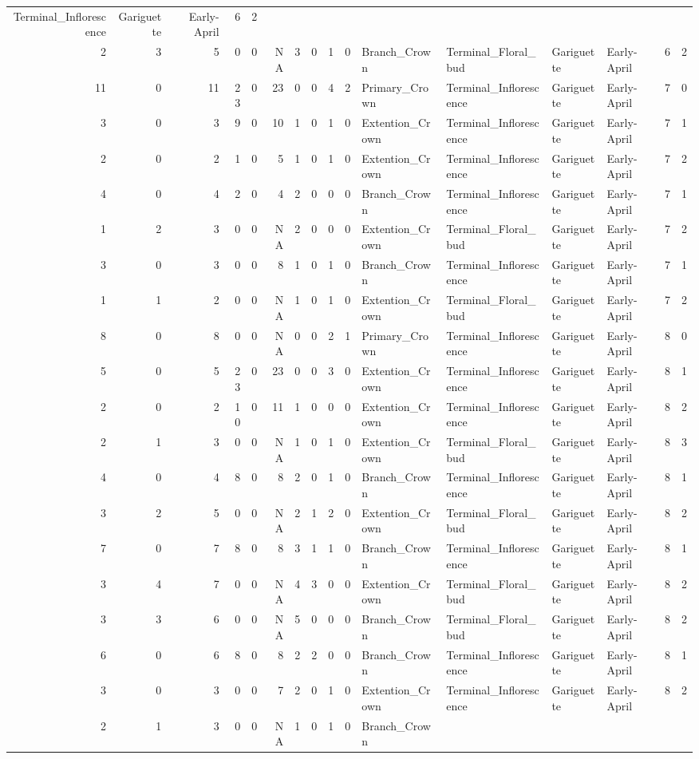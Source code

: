 \documentclass[]{article}
\begin{document}
\begin{longtable}[]{@{}rrrrrrrrrrllllrl@{}}
Terminal\_Inflorescence & Gariguette & Early-April & 6 &
2\tabularnewline
2 & 3 & 5 & 0 & 0 & NA & 3 & 0 & 1 & 0 & Branch\_Crown &
Terminal\_Floral\_bud & Gariguette & Early-April & 6 & 2\tabularnewline
11 & 0 & 11 & 23 & 0 & 23 & 0 & 0 & 4 & 2 & Primary\_Crown &
Terminal\_Inflorescence & Gariguette & Early-April & 7 &
0\tabularnewline
3 & 0 & 3 & 9 & 0 & 10 & 1 & 0 & 1 & 0 & Extention\_Crown &
Terminal\_Inflorescence & Gariguette & Early-April & 7 &
1\tabularnewline
2 & 0 & 2 & 1 & 0 & 5 & 1 & 0 & 1 & 0 & Extention\_Crown &
Terminal\_Inflorescence & Gariguette & Early-April & 7 &
2\tabularnewline
4 & 0 & 4 & 2 & 0 & 4 & 2 & 0 & 0 & 0 & Branch\_Crown &
Terminal\_Inflorescence & Gariguette & Early-April & 7 &
1\tabularnewline
1 & 2 & 3 & 0 & 0 & NA & 2 & 0 & 0 & 0 & Extention\_Crown &
Terminal\_Floral\_bud & Gariguette & Early-April & 7 & 2\tabularnewline
3 & 0 & 3 & 0 & 0 & 8 & 1 & 0 & 1 & 0 & Branch\_Crown &
Terminal\_Inflorescence & Gariguette & Early-April & 7 &
1\tabularnewline
1 & 1 & 2 & 0 & 0 & NA & 1 & 0 & 1 & 0 & Extention\_Crown &
Terminal\_Floral\_bud & Gariguette & Early-April & 7 & 2\tabularnewline
8 & 0 & 8 & 0 & 0 & NA & 0 & 0 & 2 & 1 & Primary\_Crown &
Terminal\_Inflorescence & Gariguette & Early-April & 8 &
0\tabularnewline
5 & 0 & 5 & 23 & 0 & 23 & 0 & 0 & 3 & 0 & Extention\_Crown &
Terminal\_Inflorescence & Gariguette & Early-April & 8 &
1\tabularnewline
2 & 0 & 2 & 10 & 0 & 11 & 1 & 0 & 0 & 0 & Extention\_Crown &
Terminal\_Inflorescence & Gariguette & Early-April & 8 &
2\tabularnewline
2 & 1 & 3 & 0 & 0 & NA & 1 & 0 & 1 & 0 & Extention\_Crown &
Terminal\_Floral\_bud & Gariguette & Early-April & 8 & 3\tabularnewline
4 & 0 & 4 & 8 & 0 & 8 & 2 & 0 & 1 & 0 & Branch\_Crown &
Terminal\_Inflorescence & Gariguette & Early-April & 8 &
1\tabularnewline
3 & 2 & 5 & 0 & 0 & NA & 2 & 1 & 2 & 0 & Extention\_Crown &
Terminal\_Floral\_bud & Gariguette & Early-April & 8 & 2\tabularnewline
7 & 0 & 7 & 8 & 0 & 8 & 3 & 1 & 1 & 0 & Branch\_Crown &
Terminal\_Inflorescence & Gariguette & Early-April & 8 &
1\tabularnewline
3 & 4 & 7 & 0 & 0 & NA & 4 & 3 & 0 & 0 & Extention\_Crown &
Terminal\_Floral\_bud & Gariguette & Early-April & 8 & 2\tabularnewline
3 & 3 & 6 & 0 & 0 & NA & 5 & 0 & 0 & 0 & Branch\_Crown &
Terminal\_Floral\_bud & Gariguette & Early-April & 8 & 2\tabularnewline
6 & 0 & 6 & 8 & 0 & 8 & 2 & 2 & 0 & 0 & Branch\_Crown &
Terminal\_Inflorescence & Gariguette & Early-April & 8 &
1\tabularnewline
3 & 0 & 3 & 0 & 0 & 7 & 2 & 0 & 1 & 0 & Extention\_Crown &
Terminal\_Inflorescence & Gariguette & Early-April & 8 &
2\tabularnewline
2 & 1 & 3 & 0 & 0 & NA & 1 & 0 & 1 & 0 & Branch\_Crown &

\end{longtable}
\end{document}
